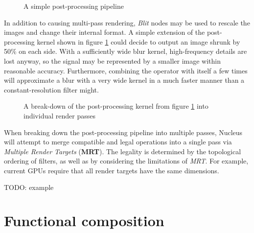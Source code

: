 \begin{figure}[h!]
  \centering
    \caption[Simple post-processing]{A simple post-processing pipeline}
  \label{fig:SimplePostProc}
\end{figure}

In addition to causing multi-pass rendering, \emph{Blit} nodes may be used to rescale the images and change their internal format. A simple extension of the post-processing kernel shown in figure \ref{fig:SimplePostProc} could decide to output an image shrunk by 50\% on each side. With a sufficiently wide blur kernel, high-frequency details are lost anyway, so the signal may be represented by a smaller image within reasonable accuracy. Furthermore, combining the operator with itself a few times will approximate a blur with a very wide kernel in a much faster manner than a constant-resolution filter might.

\begin{figure}[h!]
  \centering
    \caption[Simple post-processing breakdown]{A break-down of the post-processing kernel from figure \ref{fig:SimplePostProc} into individual render passes}
  \label{fig:SimplePostProcBreakdown}
\end{figure}

When breaking down the post-processing pipeline into multiple passes, Nucleus will attempt to merge compatible and legal operations into a single pass via \emph{Multiple Render Targets} (\textbf{MRT}). The legality is determined by the topological ordering of filters, as well as by considering the limitations of \emph{MRT}. For example, current GPUs require that all render targets have the same dimensions.

TODO: example


\section{Functional composition}

